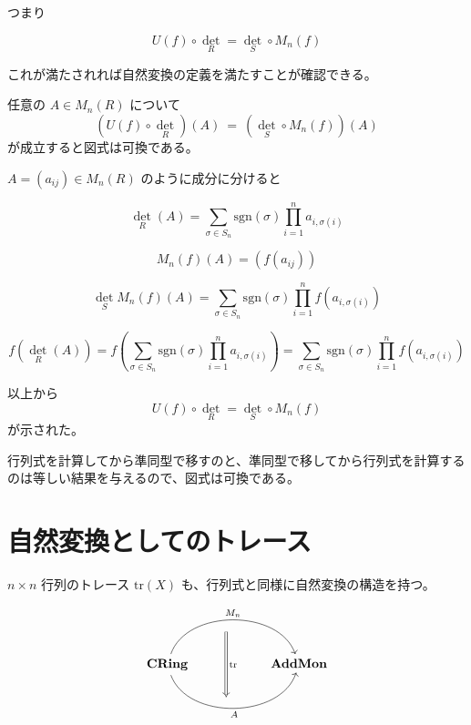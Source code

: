 \documentclass[uplatex,a4j,12pt,dvipdfmx]{jsarticle}
\begin{document}
つまり

$$
	U(f) \circ \det_{R} = \det_{S} \circ M_{n}(f)
$$

これが満たされれば自然変換の定義を満たすことが確認できる。

任意の $A \in M_{n} (R)$ について
\[
	(U(f) \circ \det_{R}) (A)
	\ = \
	(\det_{S} \circ M_{n}(f)) (A)
\]
が成立すると図式は可換である。

$A=(a_{ij}) \in M_{n} (R)$
のように成分に分けると

\[
	\det_{R} (A) = \sum_{\sigma \in S_{n}} \text{sgn}(\sigma) \prod^{n}_{i=1} a_{i , \sigma(i)}
\]

\[
	M_{n}(f)(A) = (f(a_{ij}))
\]

\[
	\det_{S} M_{n}(f)(A)
	=
	\sum_{\sigma \in S_{n}} \text{sgn}(\sigma) \prod^{n}_{i=1} f(a_{i , \sigma(i)})
\]


\[
	f(\det_{R}(A))
	=
	f \left(
	\sum_{\sigma \in S_{n}} \text{sgn}(\sigma) \prod^{n}_{i=1} a_{i , \sigma(i)}
	\right)
	=
	\sum_{\sigma \in S_{n}} \text{sgn}(\sigma) \prod^{n}_{i=1} f(a_{i , \sigma(i)})
\]

以上から
$$
	U(f) \circ \det_{R} = \det_{S} \circ M_{n}(f)
$$
が示された。

行列式を計算してから準同型で移すのと、準同型で移してから行列式を計算するのは等しい結果を与えるので、図式は可換である。


\section{自然変換としてのトレース}

$n \times n$ 行列のトレース $ \text{tr} (X)$ も、行列式と同様に自然変換の構造を持つ。

\[
	\begin{tikzcd}
		& {} \arrow[dd, "\text{tr}", Rightarrow, shift right] &                 \\
		\textbf{CRing} \arrow[rr, "M_{n}", bend left=71] \arrow[rr, "A"', bend right=71] &                                                     & \textbf{AddMon} \\
		& {}                                                  &
	\end{tikzcd}
\]
\end{document}
